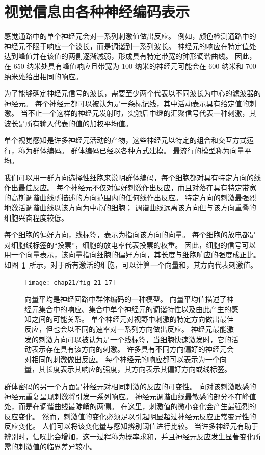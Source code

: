 \section{视觉信息由各种神经编码表示}

感觉通路中的单个神经元会对一系列刺激值做出反应。
例如，颜色检测通路中的神经元不限于响应一个波长，而是调谐到一系列波长。 
神经元的响应在特定值处达到峰值并在该值的两侧逐渐减弱，形成具有特定带宽的钟形调谐曲线。
因此，在 650 纳米处具有峰值响应且带宽为 100 纳米的神经元可能会在 600 纳米和 700 纳米处给出相同的响应。


为了能够确定神经元信号的波长，需要至少两个代表以不同波长为中心的滤波器的神经元。 
每个神经元都可以被认为是一条标记线，其中活动表示具有给定值的刺激。 
当不止一个这样的神经元发射时，突触后中继的汇聚信号代表一种刺激，其波长是所有输入代表的值的加权平均值。


单个视觉感知是许多神经元活动的产物，这些神经元以特定的组合和交互方式运行，称为群体编码。 
群体编码已经以各种方式建模。 
最流行的模型称为向量平均。


我们可以用一群方向选择性细胞来说明群体编码，每个细胞都对具有特定方向的线作出最佳反应。 
每个神经元不仅对偏好刺激作出反应，而且对落在具有特定带宽的高斯调谐曲线所描述的方向范围内的任何线作出反应。
特定方向的刺激最强烈地激活调谐曲线以该方向为中心的细胞； 
调谐曲线远离该方向但与该方向重叠的细胞兴奋程度较低。


每个细胞的偏好方向，线标签，表示为指向该方向的向量。
每个细胞的放电都是对细胞线标签的“投票”，细胞的放电率代表投票的权重。
因此，细胞的信号可以用一个向量表示，该向量指向细胞的偏好方向，其长度与细胞响应的强度成正比。
如图~\ref{fig:21_17}~所示，对于所有激活的细胞，可以计算一个向量和，其方向代表刺激值。


\begin{figure}[htbp]
	\centering
	\texttt{[image: chap21/fig\_21\_17]}
	\caption{向量平均是神经回路中群体编码的一种模型。
		向量平均值描述了神经元集合中的响应、集合中单个神经元的调谐特性以及由此产生的感知之间的可能关系。
		单个神经元对视野中刺激的特定方向做出最佳反应，但也会以不同的速率对一系列方向做出反应。
		神经元最能激发的刺激方向可以被认为是一个线标签，当细胞快速激发时，它的活动表示存在具有该方向的刺激。
		许多具有不同方向偏好的神经元会对相同的刺激做出反应。
		每个神经元的响应都可以表示为一个向量，其长度表示其响应的强度，其方向表示其偏好方向或线标签\cite{kapadia2000spatial}。}
	\label{fig:21_17}
\end{figure}


群体密码的另一个方面是神经元对相同刺激的反应的可变性。
向对该刺激敏感的神经元重复呈现刺激将引发一系列响应。
神经元调谐曲线最敏感的部分不在峰值处，而是在调谐曲线最陡峭的两侧。
在这里，刺激值的微小变化会产生最强烈的反应变化。
然而，刺激值的变化必须足以引起明显超过神经元反应正常变异性的反应变化。
人们可以将该变化量与感知辨别阈值进行比较。
当许多神经元有助于辨别时，信噪比会增加，这一过程称为概率求和，并且神经元反应发生显著变化所需的刺激值的临界差异较小。


